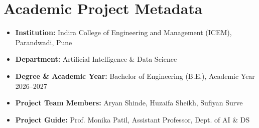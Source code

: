 \documentclass[11pt,a4paper]{report}
\begin{document}
\section{Academic Project Metadata}
\begin{itemize}[noitemsep, topsep=2pt]
    \item \textbf{Institution:} Indira College of Engineering and Management (ICEM), Parandwadi, Pune
    \item \textbf{Department:} Artificial Intelligence \& Data Science
    \item \textbf{Degree \& Academic Year:} Bachelor of Engineering (B.E.), Academic Year 2026--2027
    \item \textbf{Project Team Members:} Aryan Shinde, Huzaifa Sheikh, Sufiyan Surve
    \item \textbf{Project Guide:} Prof. Monika Patil, Assistant Professor, Dept. of AI \& DS
\end{itemize}
\clearpage
\end{document}
